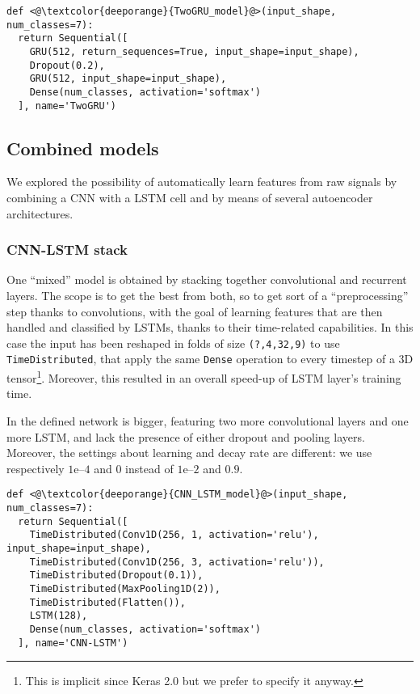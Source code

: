 \begin{minipage}[c]{.9\columnwidth}
\vspace*{.5em}
\begin{lstlisting}
def <@\textcolor{deeporange}{TwoGRU_model}@>(input_shape, num_classes=7):
  return Sequential([
    GRU(512, return_sequences=True, input_shape=input_shape),
    Dropout(0.2),
    GRU(512, input_shape=input_shape),
    Dense(num_classes, activation='softmax')
  ], name='TwoGRU')
\end{lstlisting}
\vspace*{.2em}
\end{minipage}

\subsection{Combined models}\label{ssec:combined_models}
We explored the possibility of automatically learn features from raw signals by combining a CNN with a LSTM cell and by means of several autoencoder architectures.

\subsubsection{CNN-LSTM stack}
One ``mixed'' model is obtained by stacking together convolutional and recurrent layers.
The scope is to get the best from both, so to get sort of a ``preprocessing'' step thanks to convolutions, with the goal of learning features that are then handled and classified by LSTMs, thanks to their time-related capabilities.
In this case the input has been reshaped in folds of size \texttt{(?,4,32,9)} to use \texttt{TimeDistributed}, that apply the same \texttt{Dense} operation to every timestep of a 3D tensor\footnote{This is implicit since Keras 2.0 but we prefer to specify it anyway.}.
Moreover, this resulted in an overall speed-up of LSTM layer's training time.

In \cite{Ordonez-CNN-LSTM} the defined network is bigger, featuring two more convolutional layers and one more LSTM, and lack the presence of either dropout and pooling layers. Moreover, the settings about learning and decay rate are different: we use respectively $1\mathrm{e}{\text{--}4}$ and $0$ instead of $1\mathrm{e}{\text{--}2}$ and $0.9$.

\begin{minipage}[c]{.9\columnwidth}
\vspace*{.5em}
\begin{lstlisting}
def <@\textcolor{deeporange}{CNN_LSTM_model}@>(input_shape, num_classes=7):
  return Sequential([
    TimeDistributed(Conv1D(256, 1, activation='relu'), input_shape=input_shape),
    TimeDistributed(Conv1D(256, 3, activation='relu')),
    TimeDistributed(Dropout(0.1)),
    TimeDistributed(MaxPooling1D(2)),
    TimeDistributed(Flatten()),
    LSTM(128),
    Dense(num_classes, activation='softmax')
  ], name='CNN-LSTM')
\end{lstlisting}
\vspace*{.5em}
\end{minipage}

